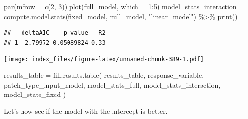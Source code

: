 \documentclass[
]{article}
\newenvironment{Shaded}{\begin{snugshade}}{\end{snugshade}}
\newcommand{\AttributeTok}[1]{\textcolor[rgb]{0.77,0.63,0.00}{#1}}
\newcommand{\DecValTok}[1]{\textcolor[rgb]{0.00,0.00,0.81}{#1}}
\newcommand{\FunctionTok}[1]{\textcolor[rgb]{0.00,0.00,0.00}{#1}}
\newcommand{\NormalTok}[1]{#1}
\newcommand{\OtherTok}[1]{\textcolor[rgb]{0.56,0.35,0.01}{#1}}
\newcommand{\SpecialCharTok}[1]{\textcolor[rgb]{0.00,0.00,0.00}{#1}}
\newcommand{\StringTok}[1]{\textcolor[rgb]{0.31,0.60,0.02}{#1}}
\begin{document}
\begin{Shaded}
\begin{Highlighting}[]
\FunctionTok{par}\NormalTok{(}\AttributeTok{mfrow =} \FunctionTok{c}\NormalTok{(}\DecValTok{2}\NormalTok{, }\DecValTok{3}\NormalTok{))}
\FunctionTok{plot}\NormalTok{(full\_model, }\AttributeTok{which =} \DecValTok{1}\SpecialCharTok{:}\DecValTok{5}\NormalTok{)}
\NormalTok{model\_stats\_interaction }\OtherTok{=} \FunctionTok{compute.model.stats}\NormalTok{(fixed\_model,}
\NormalTok{                                              null\_model,}
                                              \StringTok{"linear\_model"}\NormalTok{) }\SpecialCharTok{\%\textgreater{}\%}
  \FunctionTok{print}\NormalTok{()}
\end{Highlighting}
\end{Shaded}

\begin{verbatim}
##   deltaAIC    p_value   R2
## 1 -2.79972 0.05089824 0.33
\end{verbatim}

\texttt{[image: index\_files/figure-latex/unnamed-chunk-389-1.pdf]}

\begin{Shaded}
\begin{Highlighting}[]
\NormalTok{results\_table }\OtherTok{=} \FunctionTok{fill.results.table}\NormalTok{(}
\NormalTok{  results\_table,}
\NormalTok{  response\_variable,}
\NormalTok{  patch\_type\_input\_model,}
\NormalTok{  model\_stats\_full,}
\NormalTok{  model\_stats\_interaction,}
\NormalTok{  model\_stats\_fixed}
\NormalTok{)}
\end{Highlighting}
\end{Shaded}

Let's now see if the model with the intercept is better.
\end{document}
